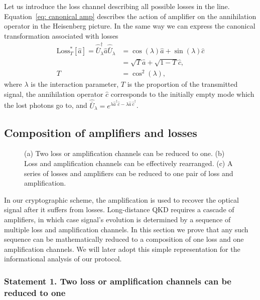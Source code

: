\documentclass[a4paper]{article}
\renewcommand{\t}[1]{\mathrm{#1}}
\newcommand{\be}{\begin{equation}}
\newcommand{\ee}{\end{equation}}
\begin{document}
Let us introduce the loss channel describing all possible losses in the line.
Equation~\eqref{eq: canonical amp} describes the action of amplifier on the annihilation operator in the Heisenberg picture.
In the same way we can express the canonical transformation associated with losses
\be\begin{split}
    \t{Loss}_T^*[\hat{a}] = \hat{\bar U}_\lambda^\dag \hat{a} \hat{\bar U}_\lambda &= \cos(\lambda) \hat{a} + \sin(\lambda) \hat{c} \\ & = \sqrt{T} \hat{a} + \sqrt{1-T} \hat{c},\\
    T& =\cos^2(\lambda),
\end{split}
\ee
where $\lambda$ is the interaction parameter, $T$ is the proportion of the transmitted signal, the annihilation operator $\hat{c}$ corresponds to the initially empty mode which the lost photons go to, and $\hat{\bar U}_\lambda=e^{\lambda \hat{a}^\dag \hat{c} - \lambda \hat{a} \, \hat{c}^\dag}$.\\


\subsection{Composition of amplifiers and losses}
\begin{figure}[t]
    \noindent{}
    \caption{
    (a) Two loss or amplification channels can be reduced to one. (b) Loss and amplification channels can be effectively rearranged. (c) A series of losses and amplifiers can be reduced to one pair of loss and amplification.
    } 
    \label{Fig2}
\end{figure}

In our cryptographic scheme, the amplification is used to recover the optical signal after it suffers from losses. 
Long-distance QKD requires a cascade of amplifiers, in which case signal's evolution is determined by a sequence of multiple loss and amplification channels.
In this section we prove that any such sequence can be mathematically reduced to a composition of one loss and one amplification channels.
We will later adopt this simple representation for the informational analysis of our protocol.

\subsubsection*{Statement 1. Two loss or amplification channels can be reduced to one}
\end{document}
